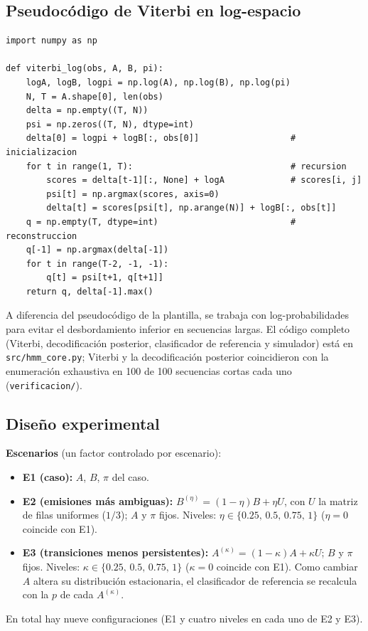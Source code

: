 \documentclass[11pt,a4paper]{article}
\begin{document}
\subsection{Pseudocódigo de Viterbi en log-espacio}

\begin{lstlisting}[caption={Viterbi en log-espacio para un HMM discreto.}]
import numpy as np

def viterbi_log(obs, A, B, pi):
    logA, logB, logpi = np.log(A), np.log(B), np.log(pi)
    N, T = A.shape[0], len(obs)
    delta = np.empty((T, N))
    psi = np.zeros((T, N), dtype=int)
    delta[0] = logpi + logB[:, obs[0]]                  # inicializacion
    for t in range(1, T):                               # recursion
        scores = delta[t-1][:, None] + logA             # scores[i, j]
        psi[t] = np.argmax(scores, axis=0)
        delta[t] = scores[psi[t], np.arange(N)] + logB[:, obs[t]]
    q = np.empty(T, dtype=int)                          # reconstruccion
    q[-1] = np.argmax(delta[-1])
    for t in range(T-2, -1, -1):
        q[t] = psi[t+1, q[t+1]]
    return q, delta[-1].max()
\end{lstlisting}

A diferencia del pseudocódigo de la plantilla, se trabaja con
log-probabilidades para evitar el desbordamiento inferior en secuencias largas.
El código completo (Viterbi, decodificación posterior, clasificador de
referencia y simulador) está en \texttt{src/hmm\_core.py}; Viterbi y la
decodificación posterior coincidieron con la enumeración exhaustiva en 100 de
100 secuencias cortas cada uno (\texttt{verificacion/}).

\subsection{Diseño experimental}

\textbf{Escenarios} (un factor controlado por escenario):
\begin{itemize}
\item \textbf{E1 (caso):} $A$, $B$, $\pi$ del caso.
\item \textbf{E2 (emisiones más ambiguas):} $B^{(\eta)}=(1-\eta)B+\eta U$,
con $U$ la matriz de filas uniformes ($1/3$); $A$ y $\pi$ fijos.
Niveles: $\eta\in\{0.25,\,0.5,\,0.75,\,1\}$ ($\eta=0$ coincide con E1).
\item \textbf{E3 (transiciones menos persistentes):}
$A^{(\kappa)}=(1-\kappa)A+\kappa U$; $B$ y $\pi$ fijos.
Niveles: $\kappa\in\{0.25,\,0.5,\,0.75,\,1\}$ ($\kappa=0$ coincide con E1).
Como cambiar $A$ altera su distribución estacionaria, el clasificador de
referencia se recalcula con la $p$ de cada $A^{(\kappa)}$.
\end{itemize}
En total hay nueve configuraciones (E1 y cuatro niveles en cada uno de E2 y E3).
\end{document}
